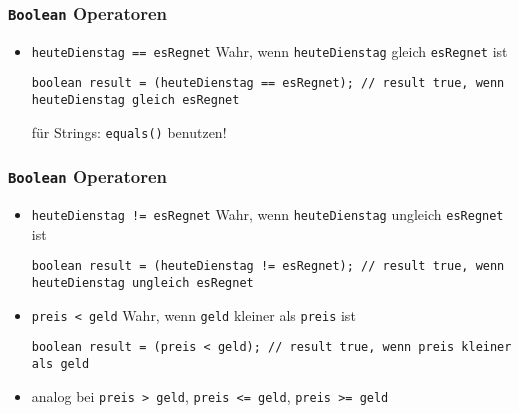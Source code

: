 \documentclass{../../presentation}
\begin{document}
\begin{frame}[fragile]
  \frametitle{\texttt{Boolean} Operatoren}
  \pause

  \begin{itemize}
    \item<2->\texttt{heuteDienstag == esRegnet} \quad Wahr, wenn \texttt{heuteDienstag} gleich \texttt{esRegnet} ist
          \begin{verbatim}
boolean result = (heuteDienstag == esRegnet); // result true, wenn heuteDienstag gleich esRegnet
    \end{verbatim}
    \achtung für Strings: \texttt{equals()} benutzen!

  \end{itemize}
\end{frame}

\begin{frame}[fragile]
  \frametitle{\texttt{Boolean} Operatoren}
  \pause

  \begin{itemize}
    \item<1->\texttt{heuteDienstag != esRegnet} \quad Wahr, wenn \texttt{heuteDienstag} ungleich \texttt{esRegnet} ist
          \begin{verbatim}
boolean result = (heuteDienstag != esRegnet); // result true, wenn heuteDienstag ungleich esRegnet
    \end{verbatim}

    \item<3->\texttt{preis < geld} \quad Wahr, wenn \texttt{geld} kleiner als \texttt{preis} ist
          \begin{verbatim}
boolean result = (preis < geld); // result true, wenn preis kleiner als geld
    \end{verbatim}

    \item<4->analog bei \texttt{preis > geld}, \texttt{preis <= geld}, \texttt{preis >= geld} \quad
  \end{itemize}
\end{frame}
\end{document}
